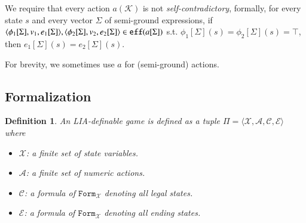 \documentclass[review]{elsarticle}
\newcommand{\formula}{\mathtt{Form}}
\newcommand{\set}[1]{\{ #1 \}}
\newcommand{\tuple}[1]{\langle {#1} \rangle}
\newcommand{\true}{\top}
\newcommand{\statevar}{\mathcal{X}}
\newcommand{\parmset}{\mathcal{K}}
\newcommand{\expVec}{\Sigma}
\newcommand{\act}{\mathcal{A}}
\newcommand{\constraint}{\mathcal{C}}
\newcommand{\estate}{\mathcal{E}}
\newcommand{\pre}{\mathtt{pre}}
\newcommand{\eff}{\mathtt{eff}}
\newcommand{\con}{\phi}
\newtheorem{definition}{Definition}
\begin{document}
	We require that every action $a(\parmset)$ is not \textit{self-contradictory}, formally, for every state $s$ and every vector $\expVec$ of semi-ground expressions, if $\tuple{\con_1[\expVec], v_1, e_1[\expVec]}, \\ \tuple{\con_2[\expVec], v_2, e_2[\expVec]} \in \eff(a[\expVec])$ s.t. $\con_1[\expVec](s) = \con_2[\expVec](s) = \true$, then $e_1[\expVec](s) = e_2[\expVec](s)$.
	
	For brevity, we sometimes use $a$ for (semi-ground) actions.
	

	\subsection{Formalization}
	\begin{definition} \label{def:game} \rm
		An LIA-definable game is defined as a tuple $\Pi = \tuple{\statevar, \act, \constraint, \estate}$ where 
		\begin{itemize}
			\item $\statevar$: a finite set of state variables. 
			\item $\act$: a finite set of numeric actions.			
			\item $\constraint$: a formula of $\formula_{\statevar}$ denoting all legal states.
			\item $\estate$: a formula of $\formula_{\statevar}$ denoting all ending states. 
		\end{itemize}
	\end{definition}
	
	
\end{document}
